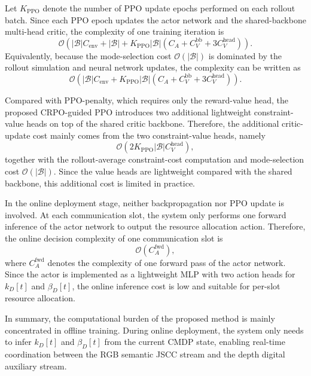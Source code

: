 \documentclass[journal]{IEEEtran}
\begin{document}
Let $K_{\mathrm{PPO}}$ denote the number of PPO update epochs performed on each rollout batch. Since each PPO epoch updates the actor network and the shared-backbone multi-head critic, the complexity of one training iteration is
\begin{equation}
\mathcal{O}
\left(
|\mathcal{B}|C_{\mathrm{env}}
+
|\mathcal{B}|
+
K_{\mathrm{PPO}}
|\mathcal{B}|
\left(
C_A
+
C_V^{\mathrm{bb}}
+
3C_V^{\mathrm{head}}
\right)
\right).
\end{equation}
Equivalently, because the mode-selection cost $\mathcal{O}(|\mathcal{B}|)$ is dominated by the rollout simulation and neural network updates, the complexity can be written as
\begin{equation}
\mathcal{O}
\left(
|\mathcal{B}|C_{\mathrm{env}}
+
K_{\mathrm{PPO}}
|\mathcal{B}|
\left(
C_A
+
C_V^{\mathrm{bb}}
+
3C_V^{\mathrm{head}}
\right)
\right).
\end{equation}

Compared with PPO-penalty, which requires only the reward-value head, the proposed CRPO-guided PPO introduces two additional lightweight constraint-value heads on top of the shared critic backbone. Therefore, the additional critic-update cost mainly comes from the two constraint-value heads, namely
\begin{equation}
\mathcal{O}
\left(
2K_{\mathrm{PPO}}
|\mathcal{B}|
C_V^{\mathrm{head}}
\right),
\end{equation}
together with the rollout-average constraint-cost computation and mode-selection cost $\mathcal{O}(|\mathcal{B}|)$. Since the value heads are lightweight compared with the shared backbone, this additional cost is limited in practice.

In the online deployment stage, neither backpropagation nor PPO update is involved. At each communication slot, the system only performs one forward inference of the actor network to output the resource allocation action. Therefore, the online decision complexity of one communication slot is
\begin{equation}
\mathcal{O}
\left(
C_A^{\mathrm{fwd}}
\right),
\end{equation}
where $C_A^{\mathrm{fwd}}$ denotes the complexity of one forward pass of the actor network. Since the actor is implemented as a lightweight MLP with two action heads for $k_D[t]$ and $\beta_D[t]$, the online inference cost is low and suitable for per-slot resource allocation.

In summary, the computational burden of the proposed method is mainly concentrated in offline training. During online deployment, the system only needs to infer $k_D[t]$ and $\beta_D[t]$ from the current CMDP state, enabling real-time coordination between the RGB semantic JSCC stream and the depth digital auxiliary stream.
\end{document}
